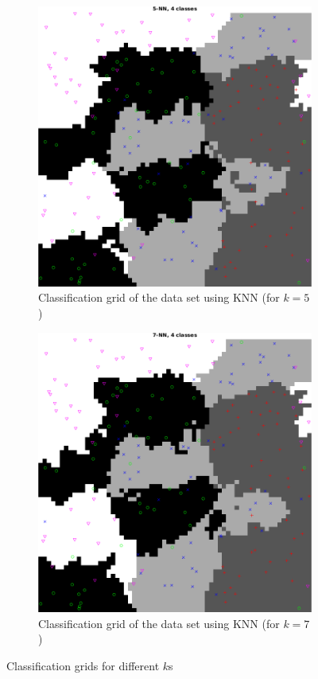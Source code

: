 \documentclass[10pt]{article}
\begin{document}
\begin{figure}[H]
  \begin{subfigure}{.48\textwidth}
    \includegraphics[width=.8\textwidth]{assign2_4_5.png}
    \caption{Classification grid of the data set using KNN (for $k=5$)}
    \label{fig2.4c}
  \end{subfigure}
  \begin{subfigure}{.48\textwidth}
    \includegraphics[width=.8\textwidth]{assign2_4_7.png}
    \caption{Classification grid of the data set using KNN (for $k=7$)}
    \label{fig2.4d}
  \end{subfigure}
  \caption{Classification grids for different $k$s}
  \label{fig2.4_a}
\end{figure}
\end{document}
